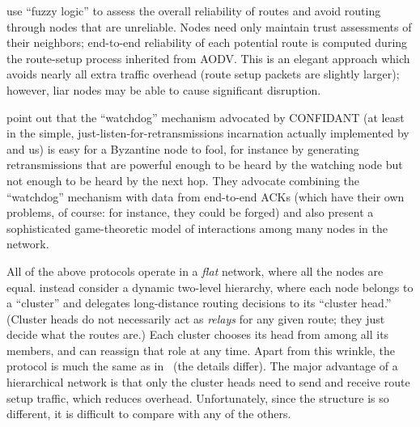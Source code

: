 \documentclass{article}
\begin{document}
\textcite{hallani2009} use “fuzzy logic” to assess the overall
reliability of routes and avoid routing through nodes that are
unreliable.  Nodes need only maintain trust assessments of their
neighbors; end-to-end reliability of each potential route is computed
during the route-setup process inherited from AODV.  This is an
elegant approach which avoids nearly all extra traffic overhead (route
setup packets are slightly larger); however, liar nodes may be able to
cause significant disruption.

\textcite{ayday2010} point out that the “watchdog” mechanism advocated
by CONFIDANT (at least in the simple, just-listen-for-retransmissions
incarnation actually implemented by \citeauthor{buchegger2002b} and
us) is easy for a Byzantine node to fool, for instance by generating
retransmissions that are powerful enough to be heard by the watching
node but not enough to be heard by the next hop.  They advocate
combining the “watchdog” mechanism with data from end-to-end ACKs
(which have their own problems, of course: for instance, they could be
forged) and also present a sophisticated game-theoretic model of
interactions among many nodes in the network.

All of the above protocols operate in a \emph{flat} network, where all
the nodes are equal.  \textcite{safa2010} instead consider a dynamic
two-level hierarchy, where each node belongs to a “cluster” and
delegates long-distance routing decisions to its “cluster head.”
(Cluster heads do not necessarily act as \emph{relays} for any given
route; they just decide what the routes are.)  Each cluster chooses
its head from among all its members, and can reassign that role at any
time.  Apart from this wrinkle, the protocol is much the same as
in~\cite{hallani2009} (the details differ).  The major advantage of a
hierarchical network is that only the cluster heads need to send and
receive route setup traffic, which reduces overhead.  Unfortunately,
since the structure is so different, it is difficult to compare with
any of the others.

\printbibliography
\end{document}
